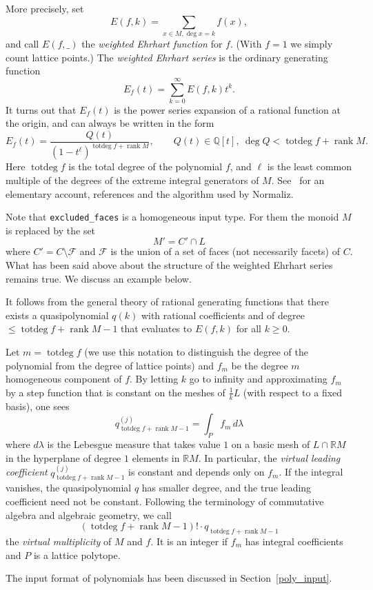 \documentclass[12pt,a4paper]{scrartcl}
\theoremstyle{definition}
\def\QQ{{\mathbb Q}}
\def\RR{{\mathbb R}}
\DeclareMathOperator{\rank}{rank}
\DeclareMathOperator{\totdeg}{totdeg}
\begin{document}
More precisely, set
$$
E(f,k)=\sum_{x\in M, \deg x=k} f(x),
$$
and call $E(f,\_)$ the \emph{weighted Ehrhart function} for
$f$. (With $f=1$ we simply count lattice points.) The
\emph{weighted Ehrhart series} is the ordinary generating
function
$$
E_f(t)=\sum_{k=0}^\infty E(f,k)t^k.
$$
It turns out that $E_f(t)$ is the power series expansion of a
rational function at the origin, and can always be written in
the form
$$
E_f(t)=\frac{Q(t)}{(1-t^\ell)^{\totdeg f+\rank M}},\qquad Q(t)\in\QQ[t],\
\deg Q< \totdeg f+\rank M.
$$
Here $\totdeg f$ is the total degree of the polynomial $f$, and
$\ell$ is the least common multiple of the degrees of the
extreme integral generators of $M$. See~\cite{BS} for an
elementary account, references and the algorithm used by Normaliz.

Note that \verb|excluded_faces| is a homogeneous input type. For them the monoid $M$ is replaced by the set
$$
M'=C'\cap L
$$
where $C'=C\setminus \mathcal F$ and $\mathcal F$ is the union of a set of
faces
(not necessarily facets) of $C$. What has been said above about the structure
of the weighted Ehrhart series remains true. We discuss an example below.

It follows from the general theory of rational generating
functions that there exists a quasipolynomial $q(k)$ with
rational coefficients and of degree $\le \totdeg f+\rank M-1$ that
evaluates to $E(f,k)$ for all $k\ge 0$.

Let $m=\totdeg f$ (we use this notation to distinguish the degree of the polynomial from the degree of lattice points) and $f_m$ be the degree $m$ homogeneous
component of $f$. By letting $k$ go to infinity and
approximating $f_m$ by a step function that is constant on the
meshes of $\frac 1kL$ (with respect to a fixed basis), one sees
$$
q^{(j)}_{\totdeg f+\rank M-1}=\int_P f_m\, d\lambda
$$
where $d\lambda$ is the Lebesgue measure that takes value $1$
on a basic mesh of $L\cap \RR M$ in the hyperplane of degree
$1$ elements in $\RR M$. In particular, the \emph{virtual
	leading coefficient} $q^{(j)}_{\totdeg f+\rank M-1}$ is
constant and depends only on $f_m$. If the integral vanishes,
the quasipolynomial $q$ has smaller degree, and the true
leading coefficient need not be constant. Following the
terminology of commutative algebra and algebraic geometry, we
call
$$
(\totdeg f+\rank M-1)!\cdot q_{\totdeg f+\rank M-1}
$$
the \emph{virtual multiplicity} of $M$ and $f$. It is an
integer if $f_m$ has integral coefficients and $P$ is a lattice
polytope.

The input format of polynomials has been discussed in Section~\ref{poly_input}.
\end{document}
